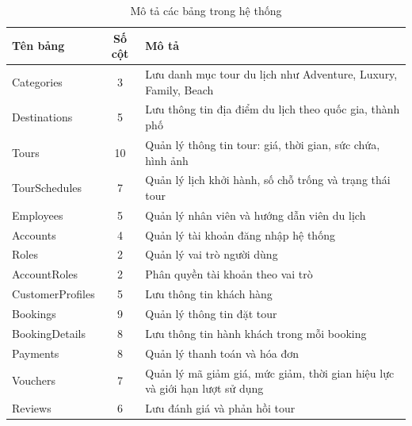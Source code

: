 \begin{table}[H]
\centering
\begin{tabular}{|l|c|p{8cm}|}
\hline
\textbf{Tên bảng} & \textbf{Số cột} & \textbf{Mô tả} \\
\hline

Categories & 3 & Lưu danh mục tour du lịch như Adventure, Luxury, Family, Beach \\
\hline

Destinations & 5 & Lưu thông tin địa điểm du lịch theo quốc gia, thành phố \\
\hline

Tours & 10 & Quản lý thông tin tour: giá, thời gian, sức chứa, hình ảnh \\
\hline

TourSchedules & 7 & Quản lý lịch khởi hành, số chỗ trống và trạng thái tour \\
\hline

Employees & 5 & Quản lý nhân viên và hướng dẫn viên du lịch \\
\hline

Accounts & 4 & Quản lý tài khoản đăng nhập hệ thống \\
\hline

Roles & 2 & Quản lý vai trò người dùng \\
\hline

AccountRoles & 2 & Phân quyền tài khoản theo vai trò \\
\hline

CustomerProfiles & 5 & Lưu thông tin khách hàng \\
\hline

Bookings & 9 & Quản lý thông tin đặt tour \\
\hline

BookingDetails & 8 & Lưu thông tin hành khách trong mỗi booking \\
\hline

Payments & 8 & Quản lý thanh toán và hóa đơn \\
\hline

Vouchers & 7 & Quản lý mã giảm giá, mức giảm, thời gian hiệu lực và giới hạn lượt sử dụng \\
\hline

Reviews & 6 & Lưu đánh giá và phản hồi tour \\
\hline

\end{tabular}
\caption{Mô tả các bảng trong hệ thống}
\end{table}

